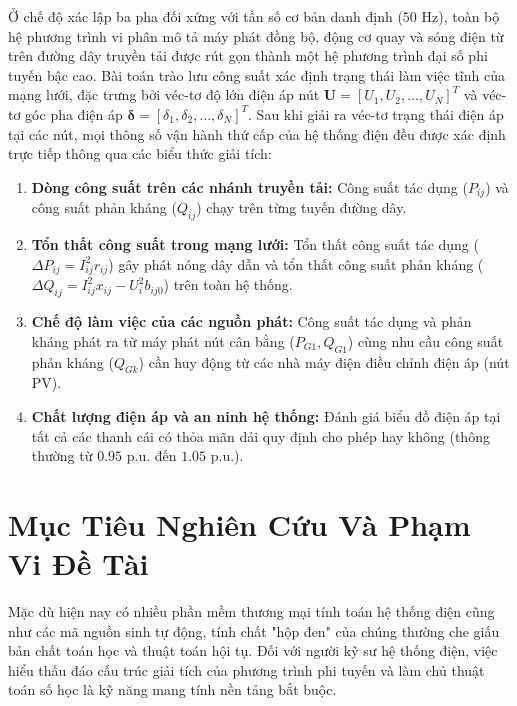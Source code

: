 \documentclass[12pt,a4paper,oneside]{report}
\begin{document}
Ở chế độ xác lập ba pha đối xứng với tần số cơ bản danh định ($50\text{ Hz}$), toàn bộ hệ phương trình vi phân mô tả máy phát đồng bộ, động cơ quay và sóng điện từ trên đường dây truyền tải được rút gọn thành một hệ phương trình đại số phi tuyến bậc cao. Bài toán trào lưu công suất xác định trạng thái làm việc tĩnh của mạng lưới, đặc trưng bởi véc-tơ độ lớn điện áp nút $\mathbf{U} = [U_1, U_2, \dots, U_N]^T$ và véc-tơ góc pha điện áp $\boldsymbol{\delta} = [\delta_1, \delta_2, \dots, \delta_N]^T$. Sau khi giải ra véc-tơ trạng thái điện áp tại các nút, mọi thông số vận hành thứ cấp của hệ thống điện đều được xác định trực tiếp thông qua các biểu thức giải tích:
\begin{enumerate}
    \item \textbf{Dòng công suất trên các nhánh truyền tải:} Công suất tác dụng ($P_{ij}$) và công suất phản kháng ($Q_{ij}$) chạy trên từng tuyến đường dây.
    \item \textbf{Tổn thất công suất trong mạng lưới:} Tổn thất công suất tác dụng ($\Delta P_{ij} = I_{ij}^2 r_{ij}$) gây phát nóng dây dẫn và tổn thất công suất phản kháng ($\Delta Q_{ij} = I_{ij}^2 x_{ij} - U_i^2 b_{ij0}$) trên toàn hệ thống.
    \item \textbf{Chế độ làm việc của các nguồn phát:} Công suất tác dụng và phản kháng phát ra từ máy phát nút cân bằng ($P_{G1}, Q_{G1}$) cùng nhu cầu công suất phản kháng ($Q_{Gk}$) cần huy động từ các nhà máy điện điều chỉnh điện áp (nút PV).
    \item \textbf{Chất lượng điện áp và an ninh hệ thống:} Đánh giá biểu đồ điện áp tại tất cả các thanh cái có thỏa mãn dải quy định cho phép hay không (thông thường từ $0.95\text{ p.u.}$ đến $1.05\text{ p.u.}$).
\end{enumerate}

\section{Mục Tiêu Nghiên Cứu Và Phạm Vi Đề Tài}
Mặc dù hiện nay có nhiều phần mềm thương mại tính toán hệ thống điện cũng như các mã nguồn sinh tự động, tính chất "hộp đen" của chúng thường che giấu bản chất toán học và thuật toán hội tụ. Đối với người kỹ sư hệ thống điện, việc hiểu thấu đáo cấu trúc giải tích của phương trình phi tuyến và làm chủ thuật toán số học là kỹ năng mang tính nền tảng bắt buộc.
\end{document}
